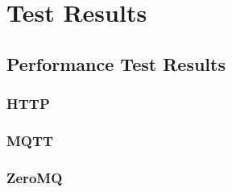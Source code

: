 \cleardoublepage
\chapter{Test Results}
\minitoc\vspace{.5cm}

\section{Performance Test Results}

\subsection{HTTP}


\subsection{MQTT}


\subsection{ZeroMQ}

